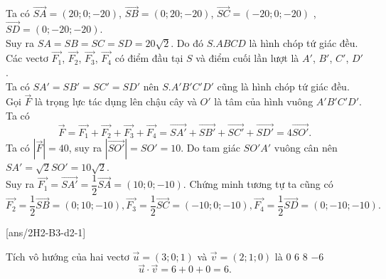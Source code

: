 \begin{vd}
{\begin{center}
		\end{center}
		Ta có $\overrightarrow{SA} = (20; 0; -20)$, $\overrightarrow{SB} = (0; 20; -20)$, $\overrightarrow{SC} = (-20; 0; -20)$ , $\overrightarrow{SD} = (0; -20; -20)$.\\
		Suy ra $SA = SB = SC = SD = 20\sqrt{2}$. Do đó $S.ABCD$ là hình chóp tứ giác đều.
		Các vectơ $\overrightarrow{F_1}$, $\overrightarrow{F_2}$, $\overrightarrow{F_3}$, $\overrightarrow{F_4}$ có điểm đầu tại $S$ và điểm cuối lần lượt là $A'$, $B'$, $C'$, $D'$.\\
		Ta có $SA' = SB' = SC' = SD'$ nên $S.A'B'C'D'$ cũng là hình chóp tứ giác đều.\\
		Gọi $\overrightarrow{F} $ là trọng lực tác dụng lên chậu cây và $O'$ là tâm của hình vuông $A'B'C'D'$. Ta có
		\[ \overrightarrow{F} =\overrightarrow{F_1} + \overrightarrow{F_2}+ \overrightarrow{F_3}+ \overrightarrow{F_4} = \overrightarrow{SA'} + \overrightarrow{SB'}+ \overrightarrow{SC'}+ \overrightarrow{SD'} = 4\overrightarrow{SO'}.\]
		Ta có $\left| \overrightarrow{F} \right| =40$, suy ra $\left| \overrightarrow{SO'} \right| = SO' = 10$.
		Do tam giác $SO'A'$ vuông cân nên $SA' = \sqrt{2}SO' = 10\sqrt{2}$.\\
		Suy ra $\overrightarrow{F_1} = \overrightarrow{SA'} = \dfrac{1}{2}\overrightarrow{SA}  = (10; 0; -10)$.
		Chứng minh tương tự ta cũng có\\
		\[ \overrightarrow{F_2} = \dfrac{1}{2}\overrightarrow{SB}  = (0; 10; -10), \overrightarrow{F_3} = \dfrac{1}{2}\overrightarrow{SC}  = (-10; 0; -10), \overrightarrow{F_4} = \dfrac{1}{2}\overrightarrow{SD}  = (0; -10; -10). \]
	}
\end{vd}

\BTTN
{}[ans/2H2-B3-d2-1]

\begin{ex}
	Tích vô hướng của hai vectơ $\vec{u}=(3;0;1)$ và $\vec{v}=(2;1;0)$ là
	\choice
	{$0$}
	{\True$6$}
	{$8$}
	{$-6$}
	\loigiai
	{
		$$\vec{u}\cdot\vec{v}=6+0+0=6.$$
	}
\end{ex} 

